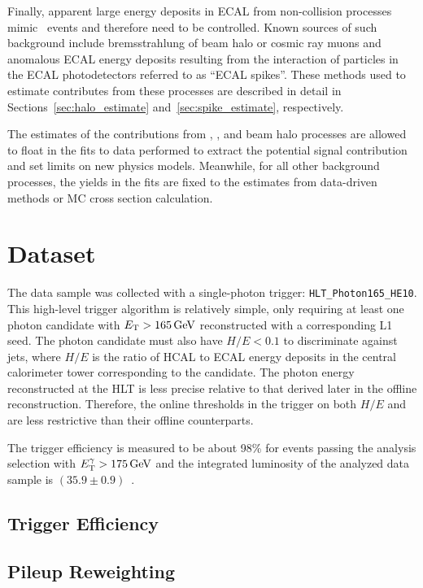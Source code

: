 Finally, apparent large energy deposits in ECAL from non-collision processes mimic \gmet\ events and therefore need to be controlled. 
Known sources of such background include bremsstrahlung of beam halo or cosmic ray muons and anomalous ECAL energy deposits resulting from the interaction of particles in the ECAL photodetectors referred to as ``ECAL spikes''. 
These methods used to estimate contributes from these processes are described in detail in Sections~\ref{sec:halo_estimate} and~\ref{sec:spike_estimate}, respectively.

The estimates of the contributions from \zinvg, \wlng, and beam halo processes are allowed to float in the fits to data performed to extract the potential signal contribution and set limits on new physics models. %
Meanwhile, for all other background processes, the yields in the fits are fixed to the estimates from data-driven methods or MC cross section calculation. 
\section{Dataset}
\label{sec:dataset}

The data sample was collected with a single-photon trigger: \texttt{HLT\_Photon165\_HE10}.
This high-level trigger algorithm is relatively simple, only requiring at least one photon candidate with $E_{\mathrm{T}} > 165\,\text{Ge\hspace{-.08em}V}$ reconstructed with a corresponding L1 seed.
The photon candidate must also have $H/E < 0.1$ to discriminate against jets, where $H/E$ is the ratio of HCAL to ECAL energy deposits in the central calorimeter tower corresponding to the candidate.
The photon energy reconstructed at the HLT is less precise relative to that derived later in the offline reconstruction. 
Therefore, the online thresholds in the trigger on both $H/E$ and \ETg are less restrictive than their offline counterparts.

The trigger efficiency is measured to be about 98\% for events passing the analysis selection with $E_{\mathrm{T}}^{\gamma} > 175\,\text{Ge\hspace{-.08em}V}$ and the integrated luminosity of the analyzed data sample is $(35.9\pm0.9)$\fbinv~\cite{CMS:2017sdi}.

\subsection{Trigger Efficiency}
\label{sec:triggereff}



\subsection{Pileup Reweighting}
\label{sec:puweight}


